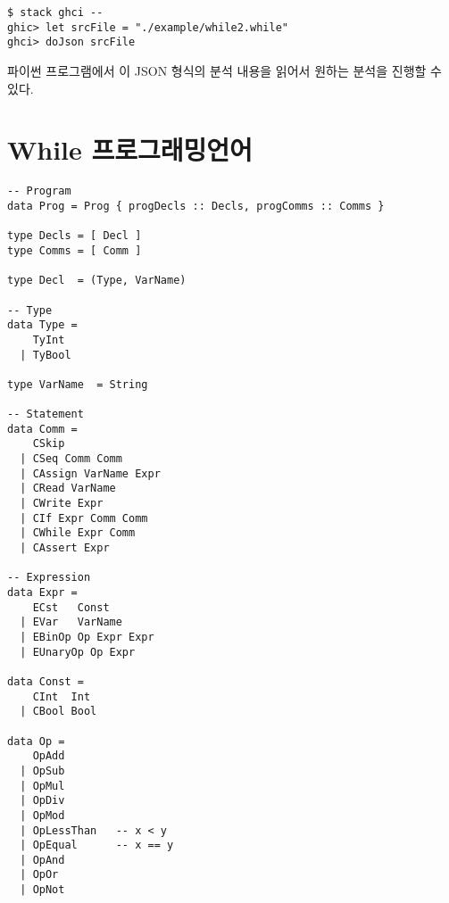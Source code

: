 \documentclass[a4paper]{book}
\begin{document}
\begin{verbatim}
$ stack ghci --
ghic> let srcFile = "./example/while2.while"
ghci> doJson srcFile
\end{verbatim}

파이썬 프로그램에서 이 JSON 형식의 분석 내용을 읽어서 원하는 분석을
진행할 수 있다.

\chapter{While 프로그래밍언어}

\begin{verbatim}
-- Program
data Prog = Prog { progDecls :: Decls, progComms :: Comms }

type Decls = [ Decl ]
type Comms = [ Comm ]

type Decl  = (Type, VarName)

-- Type
data Type =
    TyInt
  | TyBool

type VarName  = String

-- Statement
data Comm =
    CSkip
  | CSeq Comm Comm
  | CAssign VarName Expr
  | CRead VarName
  | CWrite Expr
  | CIf Expr Comm Comm
  | CWhile Expr Comm
  | CAssert Expr

-- Expression
data Expr =
    ECst   Const
  | EVar   VarName
  | EBinOp Op Expr Expr
  | EUnaryOp Op Expr

data Const =
    CInt  Int
  | CBool Bool

data Op =
    OpAdd
  | OpSub
  | OpMul
  | OpDiv
  | OpMod
  | OpLessThan   -- x < y
  | OpEqual      -- x == y
  | OpAnd
  | OpOr
  | OpNot
\end{verbatim}





\end{document}
